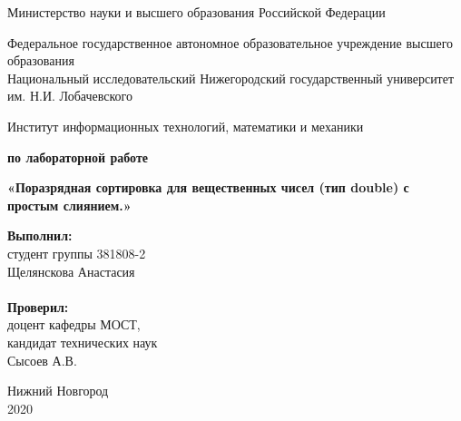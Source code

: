 \documentclass{report}
\begin{document}
\begin{titlepage}

\begin{center}
Министерство науки и высшего образования Российской Федерации
\end{center}

\begin{center}
Федеральное государственное автономное образовательное учреждение высшего образования \\
Национальный исследовательский Нижегородский государственный университет им. Н.И. Лобачевского
\end{center}

\begin{center}
Институт информационных технологий, математики и механики
\end{center}

\vspace{4em}

\begin{center}
\textbf{ по лабораторной работе} \\
\end{center}
\begin{center}
\textbf{\Large«Поразрядная сортировка для вещественных чисел (тип double) с простым слиянием.»} \\
\end{center}

\vspace{4em}

\newbox{\lbox}
\newlength{\maxl}
\setlength{\maxl}{\wd\lbox}
\hfill\parbox{7cm}{
\hspace*{5cm}\hspace*{-5cm}\textbf{Выполнил:} \\ студент группы 381808-2 \\ Щелянскова Анастасия\\
\\
\hspace*{5cm}\hspace*{-5cm}\textbf{Проверил:}\\ доцент кафедры МОСТ, \\ кандидат технических наук \\ Сысоев А.В.\\
}
\vspace{\fill}

\begin{center} Нижний Новгород \\ 2020 \end{center}

\end{titlepage}
\end{document}
